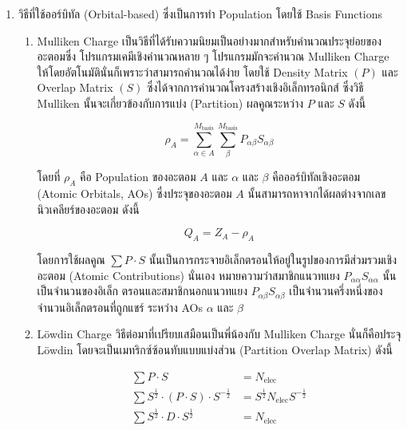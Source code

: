 \begin{enumerate}
    \item วิธีที่ใช้ออร์บิทัล (Orbital-based) ซึ่งเป็นการทำ Population โดยใช้ Basis Functions
          \begin{enumerate}
              \item Mulliken Charge\autocite{szabo1996} เป็นวิธีที่ได้รับความนิยมเป็นอย่างมากสำหรับคำนวณประจุย่อยของอะตอมซึ่ง%
                    โปรแกรมเคมีเชิงคำนวณหลาย ๆ โปรแกรมมักจะคำนวณ Mulliken Charge ให้โดยอัตโนมัตินั่นก็เพราะว่าสามารถคำนวณได้ง่าย%
                    โดยใช้ Density Matrix $(P)$ และ Overlap Matrix $(S)$ ซึ่งได้จากการคำนวณโครงสร้างเชิงอิเล็กทรอนิกส์ ซึ่งวิธี
                    Mulliken นั้นจะเกี่ยวข้องกับการแบ่ง (Partition) ผลคูณระหว่าง $P$ และ $S$ ดังนี้

                    \begin{equation}\label{eq:mulliken_pop}
                        \rho_{A} = \sum^{M_{\text{basis}}}_{\alpha \in A} \sum^{M_{\text{basis}}}_{\beta}
                        P_{\alpha\beta} S_{\alpha\beta}
                    \end{equation}

                    \noindent โดยที่ $\rho_{A}$ คือ Population ของอะตอม $A$ และ $\alpha$ และ $\beta$ คือออร์บิทัลเชิงอะตอม
                    (Atomic Orbitals, AOs) ซึ่งประจุของอะตอม $A$ นั้นสามารถหาจากได้ผลต่างจากเลขนิวเคลียร์ของอะตอม ดังนี้

                    \begin{equation}\label{eq:mulliken_charge}
                        Q_{A} = Z_{A} - \rho_{A}
                    \end{equation}

                    \noindent โดยการใช้ผลคูณ $\sum P \cdot S$ นั้นเป็นการกระจายอิเล็กตรอนให้อยู่ในรูปของการมีส่วมรวมเชิงอะตอม (Atomic
                    Contributions) นั่นเอง หมายความว่าสมาชิกแนวทแยง $P_{\alpha\alpha} S_{\alpha\alpha}$ นั้นเป็นจำนวนของอิเล็ก%
                    ตรอนและสมาชิกนอกแนวทแยง $P_{\alpha\beta} S_{\alpha\beta}$ เป็นจำนวนครึ่งหนึ่งของจำนวนอิเล็กตรอนที่ถูกแชร์%
                    ระหว่าง AOs $\alpha$ และ $\beta$

              \item L\"{o}wdin Charge\autocite{lowdin1950} วิธีต่อมาที่เปรียบเสมือนเป็นพี่น้องกับ Mulliken Charge นั่นก็คือประจุ
                    L\"{o}wdin โดยจะเป็นเมทริกซ์ซ้อนทับแบบแบ่งส่วน (Partition Overlap Matrix) ดังนี้

                    \begin{align}
                        \sum P \cdot S                                                & = N_{\text{elec}}                          \\
                        \sum S^{\frac{1}{2}} \cdot (P \cdot S) \cdot S^{-\frac{1}{2}} & =
                        S^{\frac{1}{2}} N_{\text{elec}} S^{-\frac{1}{2}}                                                           \\
                        \sum S^{\frac{1}{2}} \cdot D \cdot S^{\frac{1}{2}}            & = N_{\text{elec}} \label{eq:lowdin_charge}
                    \end{align}
          \end{enumerate}


\end{enumerate}
